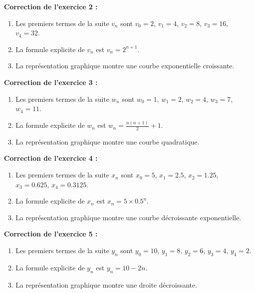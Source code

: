 \documentclass[12pt,a4paper,french]{book}
\begin{document}
\begin{corrige}
\textbf{Correction de l'exercice 2 :}
\begin{enumerate}
    \item Les premiers termes de la suite $v_n$ sont $v_0 = 2$, $v_1 = 4$, $v_2 = 8$, $v_3 = 16$, $v_4 = 32$.
    \item La formule explicite de $v_n$ est $v_n = 2^{n+1}$.
    \item La représentation graphique montre une courbe exponentielle croissante.
\end{enumerate}
\end{corrige}

\begin{corrige}
\textbf{Correction de l'exercice 3 :}
\begin{enumerate}
    \item Les premiers termes de la suite $w_n$ sont $w_0 = 1$, $w_1 = 2$, $w_2 = 4$, $w_3 = 7$, $w_4 = 11$.
    \item La formule explicite de $w_n$ est $w_n = \frac{n(n+1)}{2} + 1$.
    \item La représentation graphique montre une courbe quadratique.
\end{enumerate}
\end{corrige}

\begin{corrige}
\textbf{Correction de l'exercice 4 :}
\begin{enumerate}
    \item Les premiers termes de la suite $x_n$ sont $x_0 = 5$, $x_1 = 2.5$, $x_2 = 1.25$, $x_3 = 0.625$, $x_4 = 0.3125$.
    \item La formule explicite de $x_n$ est $x_n = 5 \times 0.5^n$.
    \item La représentation graphique montre une courbe décroissante exponentielle.
\end{enumerate}
\end{corrige}

\begin{corrige}
\textbf{Correction de l'exercice 5 :}
\begin{enumerate}
    \item Les premiers termes de la suite $y_n$ sont $y_0 = 10$, $y_1 = 8$, $y_2 = 6$, $y_3 = 4$, $y_4 = 2$.
    \item La formule explicite de $y_n$ est $y_n = 10 - 2n$.
    \item La représentation graphique montre une droite décroissante.
\end{enumerate}
\end{corrige}
\end{document}

